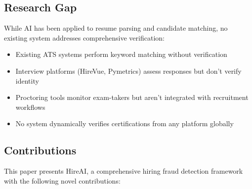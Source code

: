 \documentclass[journal]{IEEEtran}
\begin{document}
\subsection{Research Gap}
While AI has been applied to resume parsing and candidate matching, no existing system addresses comprehensive verification:
\begin{itemize}
\item Existing ATS systems perform keyword matching without verification
\item Interview platforms (HireVue, Pymetrics) assess responses but don't verify identity
\item Proctoring tools monitor exam-takers but aren't integrated with recruitment workflows
\item No system dynamically verifies certifications from any platform globally
\end{itemize}

\subsection{Contributions}
This paper presents HireAI, a comprehensive hiring fraud detection framework with the following novel contributions:
\end{document}
